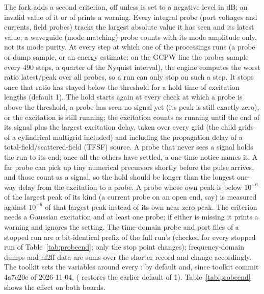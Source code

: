 The fork adds a second criterion, off unless  is set to a negative level in dB; an
invalid value of it or of  prints a warning. Every integral probe (port voltages and
currents, field probes) tracks the largest absolute value it has seen and its latest value; a waveguide
(mode-matching) probe counts with its mode amplitude only, not its mode purity. At every step at which one of the
processings runs (a probe or dump sample, or an energy estimate; on the GCPW line the probes sample every 490 steps, a
quarter of the Nyquist interval), the engine computes the worst ratio latest/peak over all probes, so a run can only
stop on such a step. It stops once that ratio has stayed below the threshold for a hold time of
 excitation lengths (default 1). The hold starts again at every check at which a
probe is above the threshold, a probe has seen no signal yet (its peak is still exactly zero), or the excitation is
still running; the excitation counts as running until the end of its signal plus the largest excitation delay, taken
over every grid (the child grids of a cylindrical multigrid included) and including the propagation delay of a
total-field/scattered-field (TFSF) source. A probe that never sees a signal holds the run to its end; once all the
others have settled, a one-time notice names it. A far probe can pick up tiny numerical precursors shortly before the
pulse arrives, and those count as a signal, so the hold should be longer than the longest one-way delay from the
excitation to a probe. A probe whose own peak is below $10^{-6}$ of the largest peak of its kind (a current probe on an
open end, say) is measured against $10^{-6}$ of that largest peak instead of its own near-zero peak. The criterion
needs a Gaussian excitation and at least one probe; if either is missing it prints a warning and ignores the setting.
The time-domain probe and port files of a stopped run are a bit-identical prefix of the full run's (checked for every
stopped run of Table~\ref{tab:probeend}; only the stop point changes); frequency-domain dumps and nf2ff data are sums
over the shorter record and change accordingly. The toolkit sets the variables around every : by
default  and, since toolkit commit 4a7e20e of 2026-11-04, 
( restores the earlier default of 1).
Table~\ref{tab:probeend} shows the effect on both boards.

